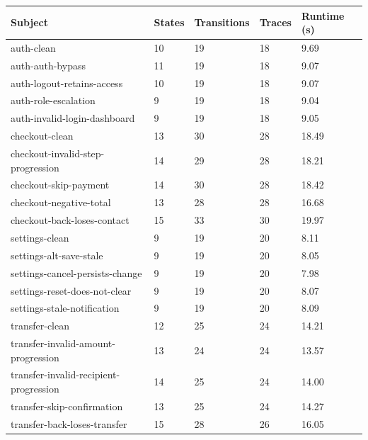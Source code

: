\begin{tabular}{lllll}
\toprule
Subject & States & Transitions & Traces & Runtime (s) \\
\midrule
auth-clean & 10 & 19 & 18 & 9.69 \\
auth-auth-bypass & 11 & 19 & 18 & 9.07 \\
auth-logout-retains-access & 10 & 19 & 18 & 9.07 \\
auth-role-escalation & 9 & 19 & 18 & 9.04 \\
auth-invalid-login-dashboard & 9 & 19 & 18 & 9.05 \\
checkout-clean & 13 & 30 & 28 & 18.49 \\
checkout-invalid-step-progression & 14 & 29 & 28 & 18.21 \\
checkout-skip-payment & 14 & 30 & 28 & 18.42 \\
checkout-negative-total & 13 & 28 & 28 & 16.68 \\
checkout-back-loses-contact & 15 & 33 & 30 & 19.97 \\
settings-clean & 9 & 19 & 20 & 8.11 \\
settings-alt-save-stale & 9 & 19 & 20 & 8.05 \\
settings-cancel-persists-change & 9 & 19 & 20 & 7.98 \\
settings-reset-does-not-clear & 9 & 19 & 20 & 8.07 \\
settings-stale-notification & 9 & 19 & 20 & 8.09 \\
transfer-clean & 12 & 25 & 24 & 14.21 \\
transfer-invalid-amount-progression & 13 & 24 & 24 & 13.57 \\
transfer-invalid-recipient-progression & 14 & 25 & 24 & 14.00 \\
transfer-skip-confirmation & 13 & 25 & 24 & 14.27 \\
transfer-back-loses-transfer & 15 & 28 & 26 & 16.05 \\
\bottomrule
\end{tabular}
